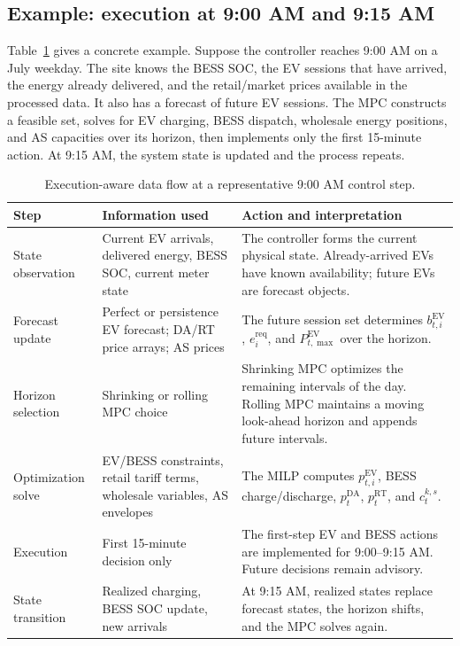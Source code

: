\documentclass[final,5p,times]{elsarticle}
\newcommand{\EV}{\mathrm{EV}}
\newcommand{\DA}{\mathrm{DA}}
\newcommand{\RT}{\mathrm{RT}}
\newcommand{\req}{\mathrm{req}}
\begin{document}
\subsection{Example: execution at 9:00 AM and 9:15 AM}
Table~\ref{tab:execution_example} gives a concrete example. Suppose the controller reaches 9:00 AM on a July weekday. The site knows the BESS SOC, the EV sessions that have arrived, the energy already delivered, and the retail/market prices available in the processed data. It also has a forecast of future EV sessions. The MPC constructs a feasible set, solves for EV charging, BESS dispatch, wholesale energy positions, and AS capacities over its horizon, then implements only the first 15-minute action. At 9:15 AM, the system state is updated and the process repeats.

\begin{table}[!t]
\centering
\caption{Execution-aware data flow at a representative 9:00 AM control step.}
\label{tab:execution_example}
\scriptsize
\begin{tabularx}{\textwidth}{@{}p{}p{}X@{}}
\toprule
Step & Information used & Action and interpretation \\
\midrule
State observation & Current EV arrivals, delivered energy, BESS SOC, current meter state & The controller forms the current physical state. Already-arrived EVs have known availability; future EVs are forecast objects.\\
Forecast update & Perfect or persistence EV forecast; DA/RT price arrays; AS prices & The future session set determines $b_{t,i}^{\EV}$, $e_i^{\req}$, and $P_{t,\max}^{\EV}$ over the horizon.\\
Horizon selection & Shrinking or rolling MPC choice & Shrinking MPC optimizes the remaining intervals of the day. Rolling MPC maintains a moving look-ahead horizon and appends future intervals.\\
Optimization solve & EV/BESS constraints, retail tariff terms, wholesale variables, AS envelopes & The MILP computes $p_{t,i}^{\EV}$, BESS charge/discharge, $p_t^{\DA}$, $p_t^{\RT}$, and $c_t^{k,s}$.\\
Execution & First 15-minute decision only & The first-step EV and BESS actions are implemented for 9:00--9:15 AM. Future decisions remain advisory.\\
State transition & Realized charging, BESS SOC update, new arrivals & At 9:15 AM, realized states replace forecast states, the horizon shifts, and the MPC solves again.\\
\bottomrule
\end{tabularx}
\end{table}
\end{document}
